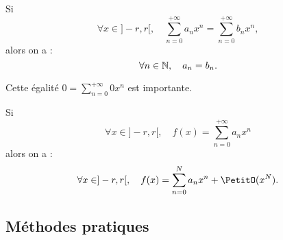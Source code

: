 \documentclass{book}
\begin{document}
\begin{Corollaire}
Si $$\forall x \in] - r, r [,\quad \sum_{n=0}^{+\infty} a_n x^n= \sum_{n=0}^{+\infty} b_n x^n,$$alors on a : $$\forall n\in \mathbb{N},\quad a_n=b_n.$$
\end{Corollaire}
\begin{Remarque}
Cette égalité $0=\sum_{n=0}^{+\infty} 0 x^n$ est importante.
\end{Remarque}

\begin{Corollaire}
Si $$\forall x \in] - r, r [,\quad f(x)=\sum_{n=0}^{+\infty} a_n x^n$$alors on a : $$\forall x \in] - r, r [,\quad f(x)=\sum_{n=0}^N a_n x^n+\PetitO(x^N).$$
\end{Corollaire}
\subsection{Méthodes pratiques}
\end{document}
